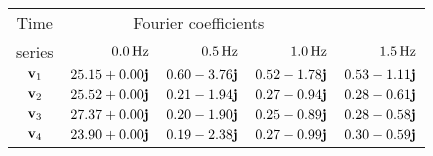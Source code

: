 \begin{tabular}{crrrr}
    \toprule
    Time    & \multicolumn{3}{c}{Fourier coefficients} \\
    series  & $\unit[0.0]{Hz}$ & $\unit[0.5]{Hz}$ & $\unit[1.0]{Hz}$ & $\unit[1.5]{Hz}$ \\\otoprule
    $\textbf{v}_{1}$ & $25.15+0.00\textbf{j}$ & $0.60-3.76\textbf{j}$ & $0.52-1.78\textbf{j}$ & $0.53-1.11\textbf{j}$ \\
    $\textbf{v}_{2}$ & $25.52+0.00\textbf{j}$ & $0.21-1.94\textbf{j}$ & $0.27-0.94\textbf{j}$ & $0.28-0.61\textbf{j}$ \\
    $\textbf{v}_{3}$ & $27.37+0.00\textbf{j}$ & $0.20-1.90\textbf{j}$ & $0.25-0.89\textbf{j}$ & $0.28-0.58\textbf{j}$ \\
    $\textbf{v}_{4}$ & $23.90+0.00\textbf{j}$ & $0.19-2.38\textbf{j}$ & $0.27-0.99\textbf{j}$ & $0.30-0.59\textbf{j}$ \\
    \bottomrule
\end{tabular}
